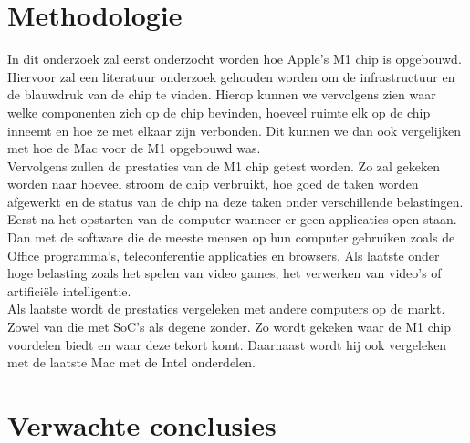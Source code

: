 \documentclass{hogent-article}
\begin{document}
\section{Methodologie}


In dit onderzoek zal eerst onderzocht worden hoe Apple's M1 chip is opgebouwd. Hiervoor zal een literatuur onderzoek gehouden worden om de infrastructuur en de blauwdruk van de chip te vinden. Hierop kunnen we vervolgens zien waar welke componenten zich op de chip bevinden, hoeveel ruimte elk op de chip inneemt en hoe ze met elkaar zijn verbonden. Dit kunnen we dan ook vergelijken met hoe de Mac voor de M1 opgebouwd was. \\
Vervolgens zullen de prestaties van de M1 chip getest worden. Zo zal gekeken worden naar hoeveel stroom de chip verbruikt, hoe goed de taken worden afgewerkt en de status van de chip na deze taken onder verschillende belastingen. Eerst na het opstarten van de computer wanneer er geen applicaties open staan. Dan met de software die de meeste mensen op hun computer gebruiken zoals de Office programma's,  teleconferentie applicaties en browsers. Als laatste onder hoge belasting zoals het spelen van video games, het verwerken van video's of artificiële intelligentie. \\
Als laatste wordt de prestaties vergeleken met andere computers op de markt. Zowel van die met SoC's als degene zonder. Zo wordt gekeken waar de M1 chip voordelen biedt en waar deze tekort komt. Daarnaast wordt hij ook vergeleken met de laatste Mac met de Intel onderdelen.

\section{Verwachte conclusies}

\end{document}
